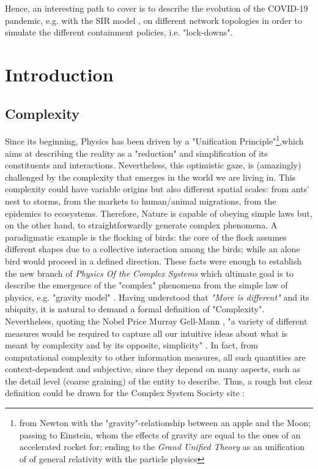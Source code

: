 \documentclass[a4paper,10pt,twoside]{book} %
\theoremstyle{definition}
\begin{document}
Hence, an interesting path to cover is to describe the evolution of the COVID-19 pandemic, e.g. with the SIR model \cite{pizzuti::2020_ItalyCOVIDnetwork}, on different network topologies in order to simulate the different containment policies, i.e. "lock-downs".

\mainmatter

\newcommand{\changefont}{%
    \fontsize{12}{12}
}
\pagestyle{fancy}
\fancyhf{}
\fancyhead[LE,RO]{\changefont \slshape \nouppercase{\rightmark}} %
\fancyhead[RE,LO]{\changefont \slshape \nouppercase{\leftmark}} %
\fancyfoot[C]{\thepage}

\chapter[Introduction]{Introduction}
%

\section{Complexity}
Since its beginning, Physics has been driven by a "Unification Principle"\footnote{from Newton with the "gravity"-relationship between an apple and the Moon; passing to Einstein, whom the effects of gravity are equal to the ones of an accelerated rocket for; ending to the \textit{Grand Unified Theory} as an unification of of general relativity with the particle physics},which aims at describing the reality as a "reduction" and simplification of its constituents and interactions. Nevertheless, this optimistic gaze, is (amazingly) challenged by the complexity that emerges in the world we are living in. This complexity could have variable origins but also different spatial scales: from ants' nest to storms, from the markets to human/animal migrations, from the epidemics to ecosystems. Therefore, Nature is capable of obeying simple laws but, on the other hand, to straightforwardly generate complex phenomena. A paradigmatic example is the flocking of birds: the core of the flock assumes different shapes due to a collective interaction among the birds; while an alone bird would proceed in a defined direction.
These facts were enough to establish the new branch of \textit{Physics Of the Complex Systems} which ultimate goal is to describe the emergence of the "complex" phenomena from the simple law of physics, e.g. "gravity model" \cite{GravityModelsandEmpiricalTrade}.
Having understood that \textit{"More is different"} \cite{Anderson:1972_MoreIsDifferent} and its ubiquity, it is natural to demand a formal definition of "Complexity". Nevertheless, quoting the Nobel Price Murray Gell-Mann \cite{Gell-Man:1987_S&C}, "a variety of different measures would be required to capture all our intuitive ideas about what is meant by complexity and by its opposite, simplicity" . In fact, from computational complexity to other information measures, all such quantities are context-dependent and subjective, since they depend on many aspects, such as the detail level (coarse graining) of the entity to describe. Thus, a rough but clear definition could be drawn for the Complex System Society site \cite{CSS:2021_compsystdef}:
\end{document}
